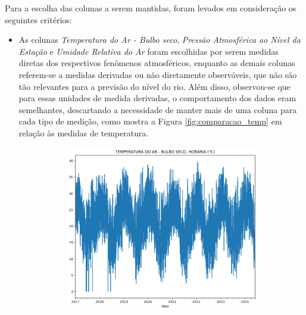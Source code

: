 Para a escolha das colunas a serem mantidas, foram levados em consideração os seguintes critérios:
\begin{itemize}
	\item As colunas \textit{Temperatura do Ar - Bulbo seco}, \textit{Pressão Atmosférica ao Nível da Estação} e \textit{Umidade Relativa do Ar} foram escolhidas por serem medidas diretas dos respectivos fenômenos atmosféricos, enquanto as demais colunas referem-se a medidas derivadas ou não diretamente observáveis, que não são tão relevantes para a previsão do nível do rio. Além disso, observou-se que para essas unidades de medida derivadas, o comportamento dos dados eram semelhantes, descartando a necessidade de manter mais de uma coluna para cada tipo de medição, como mostra a Figura \ref{fig:comparacao_temp} em relação às medidas de temperatura.
	\begin{figure}[H]
	\caption{\label{fig:comparacao_temp}Comparativo de gráficos de temperatura em diferentes tipos de medição}
	\begin{center}
		\begin{subfigure}{0.35\textwidth}
			\includegraphics[width=\linewidth]{figuras/comparacao_temp_1.png}
		\end{subfigure}
		\begin{subfigure}{0.35\textwidth}

\end{subfigure}
\end{center}
\end{figure}
\end{itemize}
